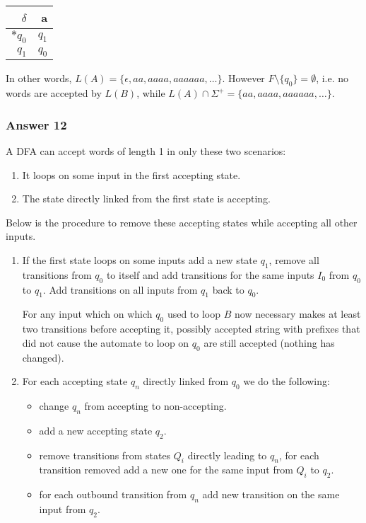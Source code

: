 \documentclass[11pt]{article}
\begin{document}
\begin{center}
\begin{tabular}{r|r}
\(\delta\) & a\\
\hline
\(*q_0\) & \(q_1\)\\
\(q_1\) & \(q_0\)\\
\end{tabular}
\end{center}

In other words, \(L(A) = \{\epsilon, aa, aaaa, aaaaaa, \dots\}\).  However
\(F \setminus \{q_0\} = \emptyset\), i.e. no words are accepted by \(L(B)\),
while \(L(A) \cap \Sigma^+ = \{aa, aaaa, aaaaaa, \dots\}\).

\subsubsection{Answer 12}
\label{sec:orgheadline17}
A DFA can accept words of length 1 in only these two scenarios:
\begin{enumerate}
\item It loops on some input in the first accepting state.
\item The state directly linked from the first state is accepting.
\end{enumerate}


Below is the procedure to remove these accepting states while accepting
all other inputs.

\begin{enumerate}
\item If the first state loops on some inputs add a new state \(q_1\), remove
all transitions from \(q_0\) to itself and add transitions for the same
inputs \(I_0\) from \(q_0\) to \(q_1\).  Add transitions on all inputs from
\(q_1\) back to \(q_0\).

For any input which on which \(q_0\) used to loop \(B\) now necessary makes
at least two transitions before accepting it, possibly accepted string
with prefixes that did not cause the automate to loop on \(q_0\) are
still accepted (nothing has changed).
\item For each accepting state \(q_n\) directly linked from \(q_0\) we do the
following:
\begin{itemize}
\item change \(q_n\) from accepting to non-accepting.
\item add a new accepting state \(q_2\).
\item remove transitions from states \(Q_i\) directly leading to \(q_n\), for
each transition removed add a new one for the same input from \(Q_i\)
to \(q_2\).
\item for each outbound transition from \(q_n\) add new transition on the
same input from \(q_2\).
\end{itemize}
\end{enumerate}
\end{document}
